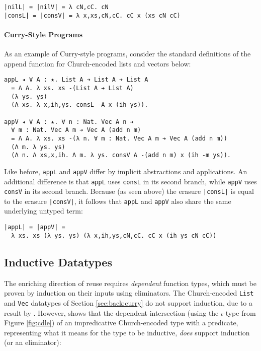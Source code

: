 \documentclass[acmsmall]{acmart}\settopmatter{}
\newcommand{\refsec}[1]{Section \ref{sec:#1}}
\newcommand{\labsec}[1]{\label{sec:#1}}
\newcommand{\reffig}[1]{Figure \ref{fig:#1}}
\begin{document}
\begin{verbatim}
|nilL| = |nilV| = λ cN,cC. cN
|consL| = |consV| = λ x,xs,cN,cC. cC x (xs cN cC)
\end{verbatim}


\paragraph{Curry-Style Programs}
As an example of Curry-style programs, consider the standard
definitions of the append function for Church-encoded lists and
vectors below:

\begin{verbatim}
appL ◂ ∀ A : ★. List A ➔ List A ➔ List A
  = Λ A. λ xs. xs -(List A ➔ List A)
  (λ ys. ys)
  (Λ xs. λ x,ih,ys. consL -A x (ih ys)).

appV ◂ ∀ A : ★. ∀ n : Nat. Vec A n ➔ 
  ∀ m : Nat. Vec A m ➔ Vec A (add n m)
  = Λ A. λ xs. xs -(λ n. ∀ m : Nat. Vec A m ➔ Vec A (add n m))
  (Λ m. λ ys. ys)
  (Λ n. Λ xs,x,ih. Λ m. λ ys. consV A -(add n m) x (ih -m ys)).
\end{verbatim}
Like before, \verb;appL; and \verb;appV; differ by implicit
abstractions and applications. An additional difference is that
\verb;appL; uses \verb;consL; in its second branch, while \verb;appV; uses
\verb;consV; in its second branch. Because (as seen above)
the erasure \verb;|consL|; is equal to the erasure \verb;|consV|;, it
follows that \verb;appL; and \verb;appV; also share the same
underlying untyped term:

\begin{verbatim}
|appL| = |appV| = 
  λ xs. xs (λ ys. ys) (λ x,ih,ys,cN,cC. cC x (ih ys cN cC))
\end{verbatim}

\subsection{Inductive Datatypes}
\labsec{back:inductive}

The enriching direction of reuse requires \textit{dependent}
function types, which must be proven by induction on their inputs using
eliminators. The Church-encoded \verb;List; and \verb;Vec; datatypes
of \refsec{back:curry} do not support induction, due to a result by
\citet{geuvers01}. However, \citet{stump18} shows that the
dependent intersection (using the $\iota$-type from \reffig{cdle})
of an impredicative Church-encoded type with a
predicate, representing what it means for the type to be inductive,
\textit{does} support induction (or an eliminator):
\end{document}
